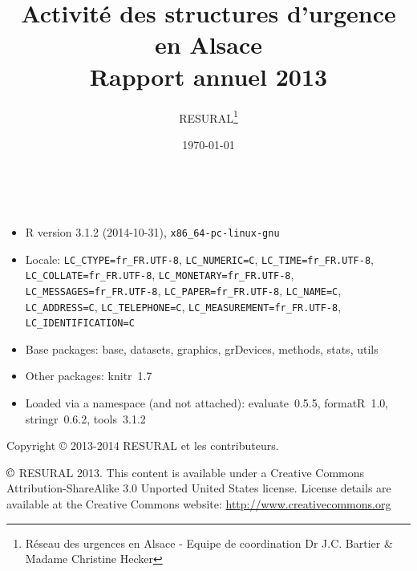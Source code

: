 \documentclass[12pt,english,french,twoside]{book}\usepackage[]{graphicx}\usepackage[]{color}
\begin{document}


\frontmatter

\title{Activité des structures d'urgence en Alsace \\Rapport annuel 2013}
\author{RESURAL\thanks{Réseau des urgences en Alsace - Equipe de coordination Dr J.C.
Bartier \& Madame Christine Hecker}}
\date{\today}
\maketitle


%

\newpage
~\vfill

\begin{itemize}\raggedright
  \item R version 3.1.2 (2014-10-31), \verb|x86_64-pc-linux-gnu|
  \item Locale: \verb|LC_CTYPE=fr_FR.UTF-8|, \verb|LC_NUMERIC=C|, \verb|LC_TIME=fr_FR.UTF-8|, \verb|LC_COLLATE=fr_FR.UTF-8|, \verb|LC_MONETARY=fr_FR.UTF-8|, \verb|LC_MESSAGES=fr_FR.UTF-8|, \verb|LC_PAPER=fr_FR.UTF-8|, \verb|LC_NAME=C|, \verb|LC_ADDRESS=C|, \verb|LC_TELEPHONE=C|, \verb|LC_MEASUREMENT=fr_FR.UTF-8|, \verb|LC_IDENTIFICATION=C|
  \item Base packages: base, datasets, graphics, grDevices,
    methods, stats, utils
  \item Other packages: knitr~1.7
  \item Loaded via a namespace (and not attached): evaluate~0.5.5,
    formatR~1.0, stringr~0.6.2, tools~3.1.2
\end{itemize}


Copyright \copyright{} 2013-2014 RESURAL et les contributeurs.

\noindent $\copyright$ RESURAL 2013. This content is available under a Creative Commons Attribution-ShareAlike 3.0 Unported United States license. License details are available at the Creative Commons website: \url{http://www.creativecommons.org} \\
\end{document}
